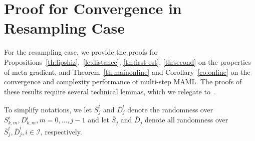 \documentclass{osudissert96}
\begin{document}






\section{Proof for Convergence in Resampling Case}\label{prop:meta_grad}
For the resampling case, we provide the proofs for Propositions~\ref{th:lipshiz},~\ref{le:distance}, \ref{th:first-est}, \ref{th:second} on the properties of meta gradient, and Theorem~\ref{th:mainonline} and Corollary~\ref{co:online} on the convergence and complexity performance of multi-step MAML. 
The proofs of these results require several technical lemmas, which we relegate to~.  

To simplify notations, we let $\bar S^i_j$ and  $\bar D^i_j$ denote the randomness over $S_{k,m}^i, D_{k,m}^i,m=0,...,j-1$ and  let $\bar S_j$ and $\bar D_j$ denote all randomness over $\bar S^i_j, \bar D^i_j, i\in \mathcal{I}$, respectively.
\end{document}
